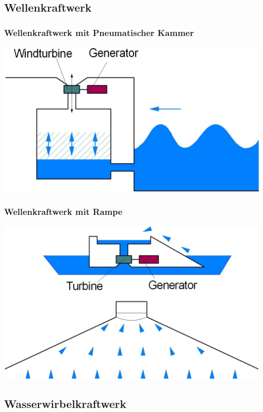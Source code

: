 \subsection{Wellenkraftwerk}

\subsubsection{Wellenkraftwerk mit Pneumatischer Kammer}
\includegraphics[width=0.65\columnwidth, align=c]{images/Wellenkraft mit Pneumatischer Kammer.png}


\subsubsection{Wellenkraftwerk mit Rampe}
\includegraphics[width=0.65\columnwidth, align=c]{images/Wellenkraft mit Rampe.png}



\subsection{Wasserwirbelkraftwerk}

